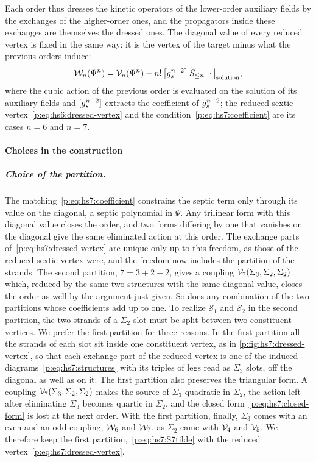 Each order thus dresses the kinetic operators of the lower-order auxiliary fields by the exchanges of the higher-order ones, and the propagators inside these exchanges are themselves the dressed ones.
The diagonal value of every reduced vertex is fixed in the same way: it is the vertex of the target minus what the previous orders induce:
\begin{equation}
  \label{p:eq:hs7:deficit}
  \dvertex{n}(\Psi^n)
    = \vertex{n}(\Psi^n) - n! \, \big[ \gs^{n - 2} \big] \, \caction[\le n - 1] \big|_{\text{solution}},
\end{equation}
where the cubic action of the previous order is evaluated on the solution of its auxiliary fields and $[\gs^{n - 2}]$ extracts the coefficient of $\gs^{n - 2}$; the reduced sextic vertex~\eqref{p:eq:hs6:dressed-vertex} and the condition~\eqref{p:eq:hs7:coefficient} are its cases $n = 6$ and $n = 7$.

\paragraph{Choices in the construction}
\label{p:sec:hs:septic:alternatives}

\subparagraph{Choice of the partition.}

The matching~\eqref{p:eq:hs7:coefficient} constrains the septic term only through its value on the diagonal, a septic polynomial in $\Psi$.
Any trilinear form with this diagonal value closes the order, and two forms differing by one that vanishes on the diagonal give the same eliminated action at this order.
The exchange parts of~\eqref{p:eq:hs7:dressed-vertex} are unique only up to this freedom, as those of the reduced sextic vertex were, and the freedom now includes the partition of the strands.
The second partition, $7 = 3 + 2 + 2$, gives a coupling $\vertex{7}(\Sigma_3, \Sigma_2, \Sigma_2)$ which, reduced by the same two structures with the same diagonal value, closes the order as well by the argument just given.
So does any combination of the two partitions whose coefficients add up to one.
To realize $\mathcal S_1$ and $\mathcal S_2$ in the second partition, the two strands of a $\Sigma_2$ slot must be split between two constituent vertices.
We prefer the first partition for three reasons.
In the first partition all the strands of each slot sit inside one constituent vertex, as in \cref{p:fig:hs7:dressed-vertex}, so that each exchange part of the reduced vertex is one of the induced diagrams~\eqref{p:eq:hs7:structures} with its triples of legs read as $\Sigma_3$ slots, off the diagonal as well as on it.
The first partition also preserves the triangular form.
A coupling $\vertex{7}(\Sigma_3, \Sigma_2, \Sigma_2)$ makes the source of $\Sigma_3$ quadratic in $\Sigma_2$, the action left after eliminating $\Sigma_3$ becomes quartic in $\Sigma_2$, and the closed form~\eqref{p:eq:hs7:closed-form} is lost at the next order.
With the first partition, finally, $\Sigma_3$ comes with an even and an odd coupling, $\dvertex{6}$ and $\dvertex{7}$, as $\Sigma_2$ came with $\vertex{4}$ and $\vertex{5}$.
We therefore keep the first partition,~\eqref{p:eq:hs7:S7tilde} with the reduced vertex~\eqref{p:eq:hs7:dressed-vertex}.

